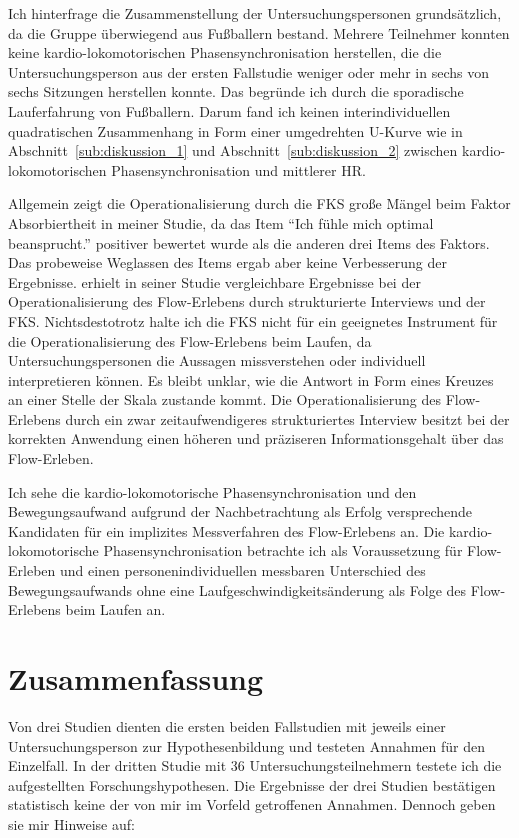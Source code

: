 Ich hinterfrage die Zusammenstellung der Untersuchungspersonen grundsätzlich, da die Gruppe überwiegend aus Fußballern bestand. Mehrere Teilnehmer konnten keine kardio-lokomotorischen Phasensynchronisation herstellen, die die Untersuchungsperson aus der ersten Fallstudie weniger oder mehr in sechs von sechs Sitzungen herstellen konnte. Das begründe ich durch die sporadische Lauferfahrung von Fußballern. Darum fand ich keinen interindividuellen quadratischen Zusammenhang in Form einer umgedrehten U-Kurve wie in Abschnitt~\ref{sub:diskussion_1} und Abschnitt~\ref{sub:diskussion_2} zwischen kardio-lokomotorischen Phasensynchronisation und mittlerer \ac{HR}.

Allgemein zeigt die Operationalisierung durch die \ac{FKS} große Mängel beim Faktor Absorbiertheit in meiner Studie, da das Item "`Ich fühle mich optimal beansprucht."' positiver bewertet wurde als die anderen drei Items des Faktors. Das probeweise Weglassen des Items ergab aber keine Verbesserung der Ergebnisse. \citet{Henk2014} erhielt in seiner Studie vergleichbare Ergebnisse bei der Operationalisierung des Flow-Erlebens durch strukturierte Interviews und der \ac{FKS}. Nichtsdestotrotz halte ich die \ac{FKS} nicht für ein geeignetes Instrument für die Operationalisierung des Flow-Erlebens beim Laufen, da Untersuchungspersonen die Aussagen missverstehen oder individuell interpretieren können. Es bleibt unklar, wie die Antwort in Form eines Kreuzes an einer Stelle der Skala zustande kommt. Die Operationalisierung des Flow-Erlebens durch ein zwar zeitaufwendigeres strukturiertes Interview besitzt bei der korrekten Anwendung einen höheren und präziseren Informationsgehalt über das Flow-Erleben. 

Ich sehe die kardio-lokomotorische Phasensynchronisation und den Bewegungsaufwand aufgrund der Nachbetrachtung als Erfolg versprechende Kandidaten für ein implizites Messverfahren des Flow-Erlebens an. Die kardio-lokomotorische Phasensynchronisation betrachte ich als Voraussetzung für Flow-Erleben und einen personenindividuellen messbaren Unterschied des Bewegungsaufwands ohne eine Laufgeschwindigkeitsänderung als Folge des Flow-Erlebens beim Laufen an. 

\section{Zusammenfassung}
\label{sec:zusammenfassung_5}

Von drei Studien dienten die ersten beiden Fallstudien mit jeweils einer Untersuchungsperson zur Hypothesenbildung und testeten Annahmen für den Einzelfall. In der dritten Studie mit 36 Untersuchungsteilnehmern testete ich die aufgestellten Forschungshypothesen. Die Ergebnisse der drei Studien bestätigen statistisch keine der von mir im Vorfeld getroffenen Annahmen. Dennoch geben sie mir Hinweise auf:

